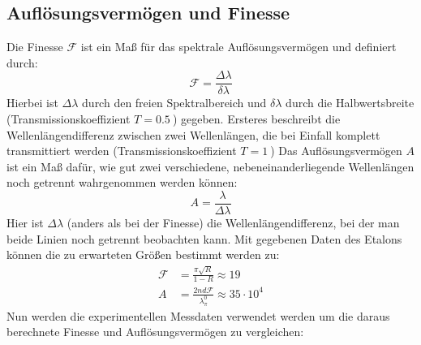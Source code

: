 \subsection{Auflösungsvermögen und Finesse}
Die Finesse $\mathcal{F}$ ist ein Maß für das spektrale Auflösungsvermögen und definiert durch:
\begin{equation*}
    \mathcal{F} = \frac{\Delta \lambda}{\delta \lambda}
\end{equation*}
Hierbei ist $\Delta \lambda$ durch den freien Spektralbereich und $\delta \lambda$ durch die Halbwertsbreite (Transmissionskoeffizient $T = \SI{0.5}{}$) gegeben. Ersteres beschreibt die Wellenlängendifferenz zwischen zwei Wellenlängen, die bei Einfall komplett transmittiert werden (Transmissionskoeffizient $T = \SI{1}{}$) 
\vspace{0,2cm}
Das Auflösungsvermögen $A$ ist ein Maß dafür, wie gut zwei verschiedene, nebeneinanderliegende Wellenlängen noch getrennt wahrgenommen werden können:
\begin{equation*}
    A = \frac{\lambda}{\Delta \lambda}
\end{equation*}
Hier ist $\Delta \lambda$ (anders als bei der Finesse) die Wellenlängendifferenz, bei der man beide Linien noch getrennt beobachten kann. Mit gegebenen Daten des Etalons~\cite{praktikum4} können die zu erwarteten Größen bestimmt werden zu:
\begin{align*}
    \mathcal{F}&= \frac{\pi\sqrt{R}}{1-R} \approx 19\\
    A &= \frac{2nd\mathcal{F}}{\lambda_{\pi}^0} \approx 35\cdot10^4
\end{align*}
\newpage
\noindent Nun werden die experimentellen Messdaten verwendet werden um die daraus berechnete Finesse und Auflösungsvermögen zu vergleichen:
